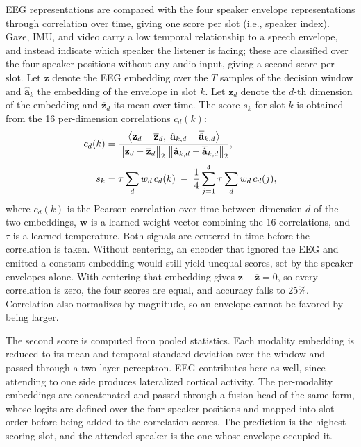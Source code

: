 \documentclass[journal]{IEEEtran}
\begin{document}
EEG representations are compared with the four speaker envelope representations through correlation over time, giving one score per slot (i.e., speaker index). Gaze, IMU, and video carry a low temporal relationship to a speech envelope, and instead indicate which speaker the listener is facing; these are classified over the four speaker positions without any audio input, giving a second score per slot. Let $\mathbf{z}$ denote the EEG embedding over the $T$ samples of the decision window and $\hat{\mathbf{a}}_k$ the embedding of the envelope in slot $k$. Let $\mathbf{z}_d$ denote the $d$-th dimension of the embedding and $\overline{\mathbf{z}}_d$ its mean over time. The score $s_k$ for slot $k$ is obtained from the 16 per-dimension correlations $c_d(k)$:
\begin{align}
c_d(k) &= \frac{\big\langle \mathbf{z}_d - \overline{\mathbf{z}}_d,\; \hat{\mathbf{a}}_{k,d} - \overline{\hat{\mathbf{a}}}_{k,d} \big\rangle}{\big\lVert \mathbf{z}_d - \overline{\mathbf{z}}_d \big\rVert_2 \; \big\lVert \hat{\mathbf{a}}_{k,d} - \overline{\hat{\mathbf{a}}}_{k,d} \big\rVert_2}, \notag \\[2pt]
s_k &= \tau \sum_d w_d\, c_d(k) \;-\; \frac{1}{4}\sum_{j=1}^{4} \tau \sum_d w_d\, c_d(j),
\label{eq:coupling}
\end{align}
where $c_d(k)$ is the Pearson correlation over time between dimension $d$ of the two embeddings, $\mathbf{w}$ is a learned weight vector combining the 16 correlations, and $\tau$ is a learned temperature. Both signals are centered in time before the correlation is taken. Without centering, an encoder that ignored the EEG and emitted a constant embedding would still yield unequal scores, set by the speaker envelopes alone. With centering that embedding gives $\mathbf{z} - \overline{\mathbf{z}} = 0$, so every correlation is zero, the four scores are equal, and accuracy falls to 25\%. Correlation also normalizes by magnitude, so an envelope cannot be favored by being larger.

The second score is computed from pooled statistics. Each modality embedding is reduced to its mean and temporal standard deviation over the window and passed through a two-layer perceptron. EEG contributes here as well, since attending to one side produces lateralized cortical activity. The per-modality embeddings are concatenated and passed through a fusion head of the same form, whose logits are defined over the four speaker positions and mapped into slot order before being added to the correlation scores. The prediction is the highest-scoring slot, and the attended speaker is the one whose envelope occupied it.
\end{document}
